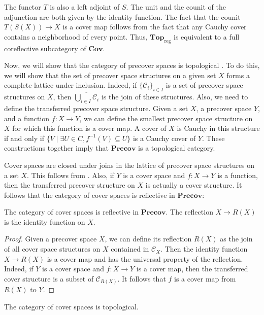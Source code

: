 \documentclass[reqno]{amsart}
\theoremstyle{definition}
\theoremstyle{remark}
\numberwithin{figure}{section}
\newcommand{\cat}[1]{\mathbf{#1}}
\begin{document}
The functor $T$ is also a left adjoint of $S$.
The unit and the counit of the adjunction are both given by the identity function.
The fact that the counit $T(S(X)) \to X$ is a cover map follows from the fact that any Cauchy cover contains a neighborhood of every point.
Thus, $\cat{Top}_\mathrm{reg}$ is equivalent to a full coreflective subcategory of $\cat{Cov}$.

Now, we will show that the category of precover spaces is topological \cite[Definition~21.7]{joy-cats}.
To do this, we will show that the set of precover space structures on a given set $X$ forms a complete lattice under inclusion.
Indeed, if $\{ \mathcal{C}_i \}_{i \in I}$ is a set of precover space structures on $X$, then $\overline{\bigcup_{i \in I} \mathcal{C}_i}$ is the join of these structures.
Also, we need to define the transferred precover space structure.
Given a set $X$, a precover space $Y$, and a function $f : X \to Y$, we can define the smallest precover space structure on $X$ for which this function is a cover map.
A cover of $X$ is Cauchy in this structure if and only if $\{ V \mid \exists U \in C, f^{-1}(V) \subseteq U \}$ is a Cauchy cover of $Y$.
These constructions together imply that $\cat{Precov}$ is a topological category.

Cover spaces are closed under joins in the lattice of precover space structures on a set $X$.
This follows from .
Also, if $Y$ is a cover space and $f : X \to Y$ is a function, then the transferred precover structure on $X$ is actually a cover structure.
It follows that the category of cover spaces is reflective in $\cat{Precov}$:

\begin{prop}
The category of cover spaces is reflective in $\cat{Precov}$.
The reflection $X \to R(X)$ is the identity function on $X$.
\end{prop}
\begin{proof}
Given a precover space $X$, we can define its reflection $R(X)$ as the join of all cover space structures on $X$ contained in $\mathcal{C}_X$.
Then the identity function $X \to R(X)$ is a cover map and has the universal property of the reflection.
Indeed, if $Y$ is a cover space and $f : X \to Y$ is a cover map, then the transferred cover structure is a subset of $\mathcal{C}_{R(X)}$.
It follows that $f$ is a cover map from $R(X)$ to $Y$.
\end{proof}

\begin{cor}
The category of cover spaces is topological.
\end{cor}
\end{document}
